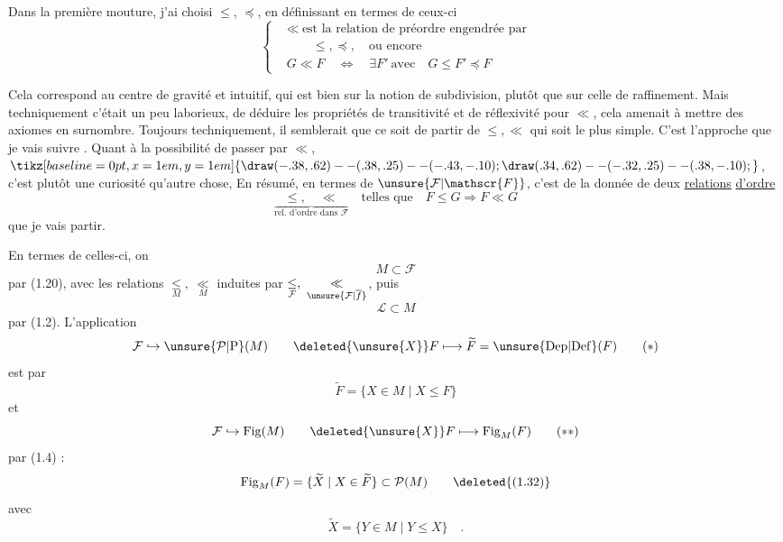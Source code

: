 Dans la première mouture, j'ai choisi $\leq$, $\preccurlyeq$, en définissant en termes de ceux-ci
\[
\left\{\begin{aligned}
 &\ll\ \text{est la relation de préordre engendrée par}\\
 &\qquad\leq,\preccurlyeq,\quad \text{ou encore}\\
 &G\ll F\quad\Longleftrightarrow\quad\exists F'\ \text{avec}\quad G\leq F'\preccurlyeq F
\end{aligned}\right.
\tag*{(1.29)}
\]

Cela correspond au centre de gravité   et intuitif, qui est bien sur la notion de subdivision, plutôt que sur celle de raffinement. Mais techniquement c'était un peu laborieux, de déduire les propriétés de transitivité et  de réflexivité pour $\ll$, cela amenait à mettre des axiomes en surnombre. Toujours techniquement, il semblerait que ce soit de partir de $\leq,\ll$ qui soit le plus simple. C'est l'approche que je vais suivre . Quant à la possibilité de passer par $\ll$, $\mathrel{\tikz[baseline=0pt,x=1em,y=1em]{\draw (-.38,.62)--(.38,.25)--(-.43,-.10); \draw (.34,.62)--(-.32,.25)--(.38,-.10);}}$, c'est plutôt une curiosité qu'autre chose,
En résumé, en termes de $\unsure{\mathcal{F}|\mathscr{F}}$, c'est de la donnée de deux \uline{relations} \uline{d'ordre}
\[
\boxed{\underset{\overbrace{\scriptstyle\text{rel. d'ordre dans }\mathcal{F}}}{\leq,\quad\ll}\quad\text{telles que}\quad F\leq G \Rightarrow F\ll G}
\tag*{(1.30)}
\]
que je vais partir.

En termes de celles-ci, on  
\[
M\subset\mathcal{F}
\]
par (1.20), avec les relations $\underset{M}{\leq},\ \underset{M}{\ll}$ induites par $\underset{\mathcal{F}}{\leq},\ \underset{\unsure{\mathcal{F}|\overline{f}}}{\ll}$, puis
\[
\mathcal{L}\subset M
\]
par (1.2). L'application
\[
\mathcal{F}\hookrightarrow\unsure{\mathcal{P}|\mathrm{P}}(M)\qquad
\deleted{\unsure{X}}F\longmapsto\widetilde F=\unsure{\mathrm{Dep}|\mathrm{Def}}(F)
\tag*{($*$)}
\]
est   par
\[
\widetilde F=\{X\in M\mid X\leq F\}
\tag*{(1.31)}
\]
et
\[
\mathcal{F}\hookrightarrow\mathrm{Fig}(M)\qquad
\deleted{\unsure{X}}F\longmapsto\mathrm{Fig}_{M}(F)
\tag*{($**$)}
\]
par (1.4) :
\[
\mathrm{Fig}_{M}(F)=\{\widetilde X\mid X\in\widetilde F\}\subset\mathcal{P}(M)
\tag*{\deleted{(1.32)}}
\]
avec
\[
\widetilde X=\{Y\in M\mid Y\leq X\}\quad.
\]

